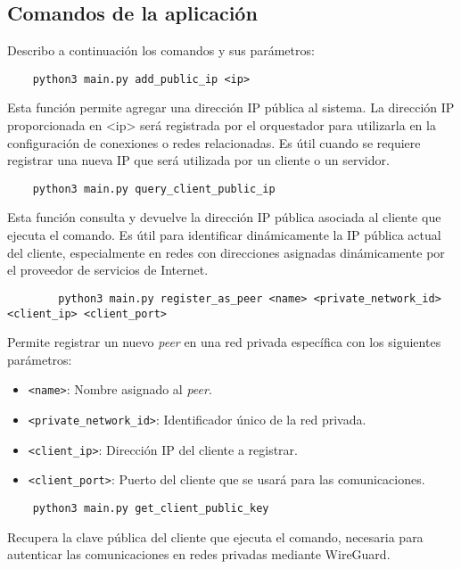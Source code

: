 \subsection*{Comandos de la aplicación}
Describo a continuación los comandos y sus parámetros: 
    \begin{verbatim}
    python3 main.py add_public_ip <ip>
    \end{verbatim}

    Esta función permite agregar una dirección IP pública al sistema. La dirección IP proporcionada en <ip> será registrada por el orquestador para utilizarla en la configuración de conexiones o redes relacionadas. Es útil cuando se requiere registrar una nueva IP que será utilizada por un cliente o un servidor.
    
    \begin{verbatim}
    python3 main.py query_client_public_ip
    \end{verbatim}

    Esta función consulta y devuelve la dirección IP pública asociada al cliente que ejecuta el comando. Es útil para identificar dinámicamente la IP pública actual del cliente, especialmente en redes con direcciones asignadas dinámicamente por el proveedor de servicios de Internet.
    
    \begin{verbatim}
        python3 main.py register_as_peer <name> <private_network_id> <client_ip> <client_port>
    \end{verbatim}
        
    Permite registrar un nuevo \textit{peer} en una red privada específica con los siguientes parámetros:  
    \begin{itemize}
        \item \texttt{<name>}: Nombre asignado al \textit{peer}.
        \item \texttt{<private\_network\_id>}: Identificador único de la red privada.
        \item \texttt{<client\_ip>}: Dirección IP del cliente a registrar.
        \item \texttt{<client\_port>}: Puerto del cliente que se usará para las comunicaciones.
    \end{itemize}
        

    \begin{verbatim}
    python3 main.py get_client_public_key
    \end{verbatim} 
    Recupera la clave pública del cliente que ejecuta el comando, necesaria para autenticar las comunicaciones en redes privadas mediante WireGuard.
    
